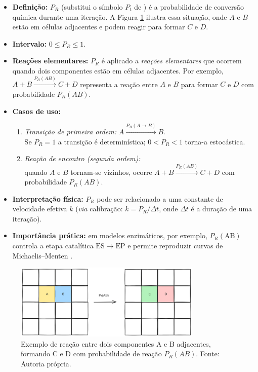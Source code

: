 \documentclass[12pt,oneside]{report}
\begin{document}
\begin{itemize}
    \item \textbf{Definição:} $P_R$ (substitui o símbolo $P_t$ de
          \citeauthor{kier2005}) é a probabilidade de conversão química
          durante uma iteração. A Figura \ref{fig:reacao} ilustra essa situação, onde $A$ e $B$ estão em células adjacentes e podem reagir para formar $C$ e $D$.
    \item \textbf{Intervalo:} $0 \le P_R \le 1$.
    \item \textbf{Reações elementares:} $P_R$ é aplicado a
          \emph{reações elementares} que ocorrem quando
          dois componentes estão em células adjacentes.
          Por exemplo, $A+B \xrightarrow{P_R(AB)} C+D$
          representa a reação entre $A$ e $B$ para formar $C$ e $D$ com probabilidade $P_R(AB)$.
    \item \textbf{Casos de uso:}
          \begin{enumerate}
              \item \emph{Transição de primeira ordem:}
                    $A \xrightarrow{P_R(A\rightarrow B)} B$.\\
                    Se $P_R=1$ a transição é determinística;
                    $0<P_R<1$ torna-a estocástica.
              \item \emph{Reação de encontro (segunda ordem):}\\
                    quando $A$ e $B$ tornam-se vizinhos,
                    ocorre $A+B \xrightarrow{P_R(AB)} C+D$
                    com probabilidade $P_R(AB)$.
          \end{enumerate}
    \item \textbf{Interpretação física:} $P_R$ pode ser relacionado a
          uma constante de velocidade efetiva $k$
          (\textit{via} calibração: $k = P_R/\Delta t$,
          onde $\Delta t$ é a duração de uma iteração).
    \item \textbf{Importância prática:}
          em modelos enzimáticos, por exemplo, $P_R(\mathrm{AB})$
          controla a etapa catalítica $\mathrm{ES}\rightarrow\mathrm{EP}$
          e permite reproduzir curvas de Michaelis–Menten
          \cite{kier2005}.
\end{itemize}

\begin{figure}[H]
    \centering
    \includegraphics[width=0.8\textwidth]{img/reacao.png}
    \caption{\small Exemplo de reação entre dois componentes A e B adjacentes, formando C e D com probabilidade de reação $P_R(AB)$. Fonte: Autoria própria.}
    \label{fig:reacao}
\end{figure}
\end{document}
